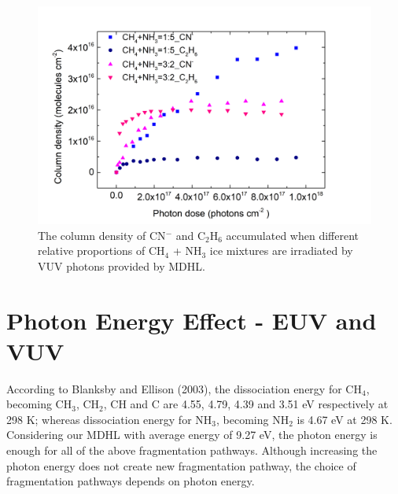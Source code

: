 \begin{figure}
\centering
\includegraphics[width=\textwidth]{figures/chapter3/C2H6_CN_comparison.png}
\caption{The column density of CN$^-$ and C$_2$H$_6$ accumulated when different relative proportions of CH$_4$ + NH$_3$ ice mixtures are irradiated by VUV photons provided by MDHL.}
\label{fig:C2H6_CN_comparison}
\end{figure}


\section{Photon Energy Effect - EUV and VUV} %

According to Blanksby and Ellison (2003), the dissociation energy for CH$_4$, becoming CH$_3$, CH$_2$, CH and C are 4.55, 4.79, 4.39 and 3.51 eV respectively at 298 K; whereas dissociation energy for NH$_3$, becoming NH$_2$ is 4.67 eV at 298 K\cite{blanksby2003bond}. Considering our MDHL with average energy of 9.27 eV, the photon energy is enough for all of the above fragmentation pathways. Although increasing the photon energy does not create new fragmentation pathway, the choice of fragmentation pathways depends on photon energy.\\

